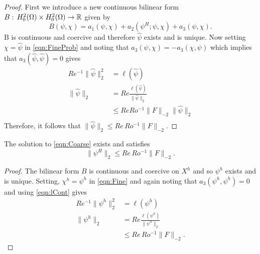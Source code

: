 \begin{proof}
  First we introduce a new continuous bilinear form $B:\, H^2_0(\Omega) \times H^2_0(\Omega) \to \mathbb{R}$ given by
  \begin{equation*}
    B(\psi,\chi) = a_1(\psi,\chi) + a_2(\psi^H;\psi,\chi) + a_3(\psi,\chi).
  \end{equation*}
  B is continuous and coercive and therefore $\hat{\psi}$ exists and is unique. Now setting $\chi=\hat{\psi}$ in
  \eqref{eqn:FineProb} and noting that $a_3(\psi,\chi) = -a_3(\chi,\psi)$ which implies that
  $a_3(\hat{\psi},\hat{\psi}) = 0$ gives
  \begin{align*}
    Re^{-1} \|\hat{\psi}\|_2^2 &= \ell(\hat{\psi}) \\
    \|\hat{\psi}\|_2 &= Re \frac{\ell(\hat{\psi})}{\|\hat{\psi}\|_2} \\
    &\le Re Ro^{-1} \|F\|_{-2}\|\hat{\psi}\|_2 \\
  \end{align*}
  Therefore, it follows that $\|\hat{\psi}\|_2 \le Re\, Ro^{-1} \|F\|_{-2}$.
\end{proof}
\begin{lemma} \label{lma:Fineh}
  The solution to \eqref{eqn:Coarse} exists and satisfies
  \begin{equation*}
    \|\psi^H\|_2 \le Re\, Ro^{-1} \|F\|_{-2}.
  \end{equation*}
\end{lemma}
\begin{proof}
  The bilinear form $B$ is continuous and coercive on $X^h$ and so $\psi^h$ exists and is unique. Setting,
  $\chi^h=\psi^h$ in \eqref{eqn:Fine} and again noting that $a_3(\psi^h,\psi^h)=0$ and using
  \eqref{eqn:lCont} gives
  \begin{align*}
    Re^{-1} \|\psi^h\|_2^2 &= \ell(\psi^h) \\
    \|\psi^h\|_2 &= Re \frac{\ell(\psi^h)}{\|\psi^h\|_2} \\
    &\le Re\, Ro^{-1} \|F\|_{-2}.
  \end{align*}
\end{proof}
